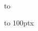 \documentclass{article}
\def\dashfill{\cleaders\hbox{-~-}\hfill}
\begin{document}
\hbox to \hsize{\dashfill\hfil}

\hbox to 100pt{x}
\end{document}
